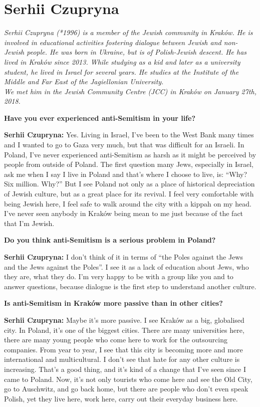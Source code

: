 \section{Serhii Czupryna}

\textit{Serhii Czupryna (*1996) is a member of the Jewish community in Kraków. He is involved in educational activities fostering dialogue between Jewish and non-Jewish people. He was born in Ukraine, but is of Polish-Jewish descent. He has lived in Kraków since 2013. While studying as a kid and later as a university student, he lived in Israel for several years. He studies at the Institute of the Middle and Far East of the Jagiellonian University. \\
We met him in the Jewish Community Centre (JCC) in Kraków on January 27th, 2018.}\par
\vspace*{2em}
\textbf{Have you ever experienced anti-Semitism in your life?}\par
\textbf{Serhii Czupryna:} Yes. Living in Israel, I’ve been to the West Bank many times and I wanted to go to Gaza very much, but that was difficult for an Israeli. In Poland, I’ve never experienced anti-Semitism as harsh as it might be perceived by people from outside of Poland. The first question many Jews, especially in Israel, ask me when I say I live in Poland and that’s where I choose to live, is: ``Why? Six million. Why?'' But I see Poland not only as a place of historical depreciation of Jewish culture, but as a great place for its revival. I feel very comfortable with being Jewish here, I feel safe to walk around the city with a kippah on my head. I’ve never seen anybody in Kraków being mean to me just because of the fact that I’m Jewish. \par
\textbf{Do you think anti-Semitism is a serious problem in Poland?}\par 
\textbf{Serhii Czupryna:} I don’t think of it in terms of ``the Poles against the Jews and the Jews against the Poles''. I see it as a lack of education about Jews, who they are, what they do. I’m very happy to be with a group like you and to answer questions, because dialogue is the first step to understand another culture. \par
\textbf{Is anti-Semitism in Kraków more passive than in other cities?}\par
\textbf{Serhii Czupryna:} Maybe it's more passive. I see Kraków as a big, globalised city. In Poland, it’s one of the biggest cities. There are many universities here, there are many young people who come here to work for the outsourcing companies. From year to year, I see that this city is becoming more and more international and multicultural. I don’t see that hate for any other culture is increasing. That’s a good thing, and it's kind of a change that I’ve seen since I came to Poland. Now, it's not only tourists who come here and see the Old City, go to Auschwitz, and go back home, but there are people who don’t even speak Polish, yet they live here, work here, carry out their everyday business here.\par 
